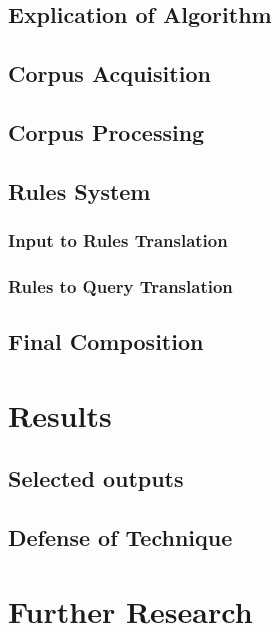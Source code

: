 \documentclass[10pt]{article}
\begin{document}
\subsection{Explication of Algorithm}
\subsection{Corpus Acquisition}
\subsection{Corpus Processing}
\subsection{Rules System}
\subsubsection{Input to Rules Translation}
\subsubsection{Rules to Query Translation}
\subsection{Final Composition}
\section{Results}
\subsection{Selected outputs}
\subsection{Defense of Technique}
\section{Further Research}



\end{document}
